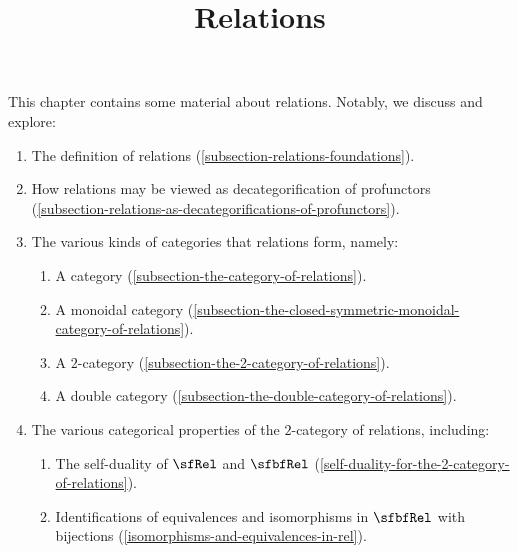 

%



\title{Relations}

\maketitle

\label{section-phantom}

This chapter contains some material about relations. Notably, we discuss and explore:
\begin{enumerate}
    \item\label{relations-introduction-item-1}The definition of relations (\cref{subsection-relations-foundations}).
    \item\label{relations-introduction-item-2}How relations may be viewed as decategorification of profunctors (\cref{subsection-relations-as-decategorifications-of-profunctors}).
    \item\label{relations-introduction-item-3}The various kinds of categories that relations form, namely:
        \begin{enumerate}
            \item\label{relations-introduction-item-3a}A category (\cref{subsection-the-category-of-relations}).
            \item\label{relations-introduction-item-3b}A monoidal category (\cref{subsection-the-closed-symmetric-monoidal-category-of-relations}).
            \item\label{relations-introduction-item-3c}A $2$-category (\cref{subsection-the-2-category-of-relations}).
            \item\label{relations-introduction-item-3d}A double category (\cref{subsection-the-double-category-of-relations}).
        \end{enumerate}
    \item\label{relations-introduction-item-4}The various categorical properties of the $2$-category of relations, including:
        \begin{enumerate}
            \item\label{relations-introduction-item-4a}The self-duality of $\sfRel$ and $\sfbfRel$ (\cref{self-duality-for-the-2-category-of-relations}).
            \item\label{relations-introduction-item-4b}Identifications of equivalences and isomorphisms in $\sfbfRel$ with bijections (\cref{isomorphisms-and-equivalences-in-rel}).

\end{enumerate}
\end{enumerate}
